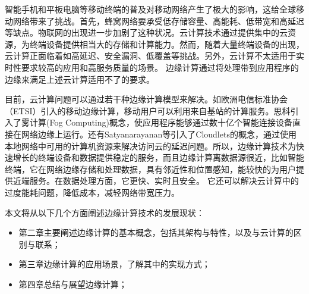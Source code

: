 \documentclass[UTF8,12pt,twoside,a4paper]{ctexart} %
\begin{document}
\setcounter{page}{1}

\begin{center}
\end{center}
\vspace*{10pt}

\indent\setlength{\parindent}{2em}%
\songti
智能手机和平板电脑等移动终端的普及对移动网络产生了极大的影响，这给全球移动网络带来了挑战。首先，蜂窝网络要承受低存储容量、高能耗、低带宽和高延迟等缺点。物联网的出现进一步加剧了这种状况。云计算技术通过提供集中的云资源，为终端设备提供相当大的存储和计算能力。然而，随着大量终端设备的出现，云计算正面临着如高延迟、安全漏洞、低覆盖等挑战。另外，云计算不太适用于实时性要求较高的应用和高服务质量的场景。
边缘计算通过将处理带到应用程序的边缘来满足上述云计算适用不了的要求。

目前，云计算问题可以通过若干种边缘计算模型来解决。如欧洲电信标准协会（ETSI）引入的移动边缘计算\cite{RN1}，移动用户可以利用来自基站的计算服务。思科引入了雾计算(Fog Computing)\cite{RN2}概念，使应用程序能够通过数十亿个智能连接设备直接在网络边缘上运行。还有Satyanarayanan等引入了Cloudlets\cite{RN3}的概念，通过使用本地网络中可用的计算机资源来解决访问云的延迟问题。所以，边缘计算技术为快速增长的终端设备和数据提供稳定的服务，而且边缘计算离数据源很近，比如智能终端，它在网络边缘存储和处理数据，具有邻近性和位置感知，能较快的为用户提供近端服务。在数据处理方面，它更快、实时且安全。 它还可以解决云计算中的过度能耗问题，降低成本，减轻网络带宽压力。

本文将从以下几个方面阐述边缘计算技术的发展现状：
\begin{itemize}
    \item 第二章主要阐述边缘计算的基本概念，包括其架构与特性，以及与云计算的区别与联系；
    \item 第三章边缘计算的应用场景，了解其中的实现方式；
    \item 第四章总结与展望边缘计算；
\end{itemize}

\clearpage


\end{document}
